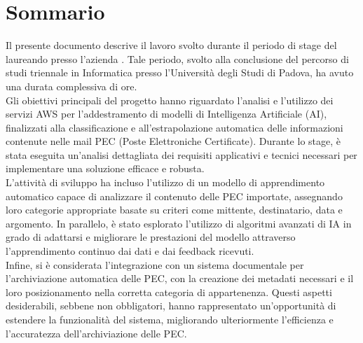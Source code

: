 \cleardoublepage
{}
{}
\begingroup
\let\clearpage\relax
\let\cleardoublepage\relax

\chapter*{Sommario}

Il presente documento descrive il lavoro svolto durante il periodo di stage del laureando \myName presso l'azienda \myCompany. Tale periodo, svolto alla conclusione del percorso di studi triennale in Informatica presso l'Università degli Studi di Padova, ha avuto una durata complessiva di \myHours ore. \\
Gli obiettivi principali del progetto hanno riguardato l'analisi e l'utilizzo dei servizi AWS per l'addestramento di modelli di Intelligenza Artificiale (AI), finalizzati alla classificazione e all'estrapolazione automatica delle informazioni contenute nelle mail PEC (Poste Elettroniche Certificate). Durante lo stage, è stata eseguita un'analisi dettagliata dei requisiti applicativi e tecnici necessari per implementare una soluzione efficace e robusta. \\
L'attività di sviluppo ha incluso l'utilizzo di un modello di apprendimento automatico capace di analizzare il contenuto delle PEC importate, assegnando loro categorie appropriate basate su criteri come mittente, destinatario, data e argomento. In parallelo, è stato esplorato l'utilizzo di algoritmi avanzati di IA in grado di adattarsi e migliorare le prestazioni del modello attraverso l'apprendimento continuo dai dati e dai feedback ricevuti. \\
Infine, si è considerata l'integrazione con un sistema documentale per l'archiviazione automatica delle PEC, con la creazione dei metadati necessari e il loro posizionamento nella corretta categoria di appartenenza. Questi aspetti desiderabili, sebbene non obbligatori, hanno rappresentato un'opportunità di estendere la funzionalità del sistema, migliorando ulteriormente l'efficienza e l'accuratezza dell'archiviazione delle PEC. \\

\endgroup
\vfill
